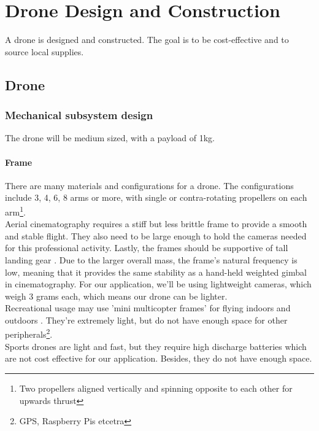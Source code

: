 \chapter{Drone Design and Construction}

A drone is designed and constructed. The goal is to be cost-effective and to source local supplies.

\section{Drone}

\subsection{Mechanical subsystem design}

The drone will be medium sized, with a payload of 1kg.

\subsubsection{Frame}

There are many materials and configurations for a drone. The configurations include 3, 4, 6, 8 arms or more, with single or contra-rotating propellers on each arm\footnote{Two propellers aligned vertically and spinning opposite to each other for upwards thrust}. \\

Aerial cinematography requires a stiff but less brittle frame to provide a smooth and stable flight. They also need to be large enough to hold the cameras needed for this professional activity. Lastly, the frames should be supportive of tall landing gear \cite{frame}. Due to the larger overall mass, the frame's natural frequency is low, meaning that it provides the same stability as a hand-held weighted gimbal in cinematography. For our application, we'll be using lightweight cameras, which weigh 3 grams each, which means our drone can be lighter.\\

Recreational usage may use 'mini multicopter frames' for flying indoors and outdoors \cite{frame}. They're extremely light, but do not have enough space for other peripherals\footnote{GPS, Raspberry Pis etcetra}.\\

Sports drones are light and fast, but they require high discharge batteries which are not cost effective for our application. Besides, they do not have enough space.\\

